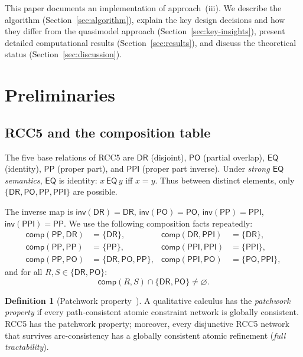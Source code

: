 \documentclass[a4paper,11pt]{article}
\theoremstyle{definition}
\newtheorem{definition}[theorem]{Definition}
\newcommand{\DR}{\ensuremath{\mathsf{DR}}}
\newcommand{\PO}{\ensuremath{\mathsf{PO}}}
\newcommand{\EQ}{\ensuremath{\mathsf{EQ}}}
\newcommand{\PP}{\ensuremath{\mathsf{PP}}}
\newcommand{\PPI}{\ensuremath{\mathsf{PPI}}}
\newcommand{\inv}{\ensuremath{\mathsf{inv}}}
\newcommand{\comp}{\ensuremath{\mathsf{comp}}}
\begin{document}
This paper documents an implementation of approach~(iii).
We describe the algorithm (Section~\ref{sec:algorithm}), explain
the key design decisions and how they differ from the quasimodel
approach (Section~\ref{sec:key-insights}), present detailed
computational results (Section~\ref{sec:results}), and discuss
the theoretical status (Section~\ref{sec:discussion}).


\section{Preliminaries}
\label{sec:prelim}

\subsection{RCC5 and the composition table}

The five base relations of RCC5 are $\DR$ (disjoint), $\PO$ (partial
overlap), $\EQ$ (identity), $\PP$ (proper part), and $\PPI$ (proper
part inverse).  Under \emph{strong $\EQ$ semantics}, $\EQ$ is
identity: $x\,\EQ\,y$ iff $x = y$.  Thus between distinct elements,
only $\{\DR,\PO,\PP,\PPI\}$ are possible.

The inverse map is $\inv(\DR) = \DR$, $\inv(\PO) = \PO$,
$\inv(\PP) = \PPI$, $\inv(\PPI) = \PP$.
We use the following composition facts repeatedly:
\begin{align}
  \comp(\PP,\DR)  &= \{\DR\},
  &\comp(\DR,\PPI) &= \{\DR\},
  \label{eq:singleton-comp} \\
  \comp(\PP,\PP)  &= \{\PP\},
  &\comp(\PPI,\PPI) &= \{\PPI\},
  \label{eq:transitive-comp} \\
  \comp(\PP,\PO)  &= \{\DR,\PO,\PP\},
  &\comp(\PPI,\PO)  &= \{\PO,\PPI\},
  \label{eq:mixed-comp}
\end{align}
and for all $R, S \in \{\DR, \PO\}$:
\begin{equation}
  \comp(R, S) \cap \{\DR, \PO\} \neq \varnothing.
  \label{eq:drpo-support}
\end{equation}

\begin{definition}[Patchwork property~\cite{RenzNebel1999}]
A qualitative calculus has the \emph{patchwork property} if every
path-consistent atomic constraint network is globally consistent.
RCC5 has the patchwork property; moreover, every disjunctive RCC5
network that survives arc-consistency has a globally consistent atomic
refinement (\emph{full tractability}).
\end{definition}
\end{document}
